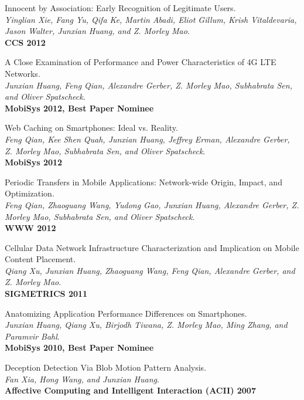 \documentclass[letterpaper]{article}
\renewenvironment{itemize}{
  \begin{list}{}{
    \setlength{\leftmargin}{1em}
  }
}{
  \end{list}
}
\begin{document}
\begin{itemize}
\item {Innocent by Association: Early Recognition of Legitimate Users.\\
{\em Yinglian Xie, Fang Yu, Qifa Ke, Martin Abadi, Eliot Gillum, Krish Vitaldevaria, Jason Walter, Junxian Huang, and Z. Morley Mao}.\\
{\bf CCS 2012}}

\item {A Close Examination of Performance and Power Characteristics of 4G LTE Networks.\\
{\em Junxian Huang, Feng Qian, Alexandre Gerber, Z. Morley Mao, Subhabrata Sen, and Oliver Spatscheck}.\\
{\bf MobiSys 2012, Best Paper Nominee}}

\item {Web Caching on Smartphones: Ideal vs. Reality.\\
{\em Feng Qian, Kee Shen Quah, Junxian Huang, Jeffrey Erman, Alexandre Gerber, Z. Morley Mao, Subhabrata Sen, and Oliver Spatscheck}.\\
{\bf MobiSys 2012}}



\item {Periodic Transfers in Mobile Applications: Network-wide Origin, Impact, and Optimization.\\
{\em Feng Qian, Zhaoguang Wang, Yudong Gao, Junxian Huang, Alexandre Gerber, Z. Morley Mao, Subhabrata Sen, and Oliver Spatscheck}.\\
{\bf WWW 2012}}


\item {Cellular Data Network Infrastructure Characterization and Implication on Mobile Content Placement.\\
{\em Qiang Xu, Junxian Huang, Zhaoguang Wang, Feng Qian, Alexandre Gerber, and Z. Morley Mao}.\\
{\bf SIGMETRICS 2011}}

\item {Anatomizing Application Performance Differences on Smartphones.\\
{\em Junxian Huang, Qiang Xu, Birjodh Tiwana, Z. Morley Mao, Ming Zhang, and Paramvir Bahl}. \\
{\bf MobiSys 2010, Best Paper Nominee}}

\item {Deception Detection Via Blob Motion Pattern Analysis.\\
{\em Fan Xia, Hong Wang, and Junxian Huang}. \\
{\bf Affective Computing and Intelligent Interaction (ACII) 2007}}
\end{itemize}
\end{document}
